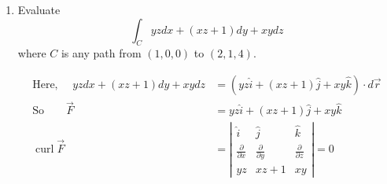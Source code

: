 \begin{enumerate}
\begin{answer}
\begin{align*}
		 &=\left(2 x^{2} z+\cos y z-y z \sin y z-2 x^{2} z-\right.\cos y z+y z \sin y z) \hat{i} \\ \qquad&+(4 x y z-4 x y z) \hat{j}+\left(2 x z^{2}-2 x z^{2}\right) \hat{k}=0 
		\end{align*}
		Since, curl $\vec{F}=0$. So, $\vec{F}$ is conservative vector field.\\ So, the given line integral is independent of path.\\ Let us find the potential $\phi$ corresponding to $\vec{F}$.
		\begin{align}
		\vec{F}&=\nabla \phi\notag\\
		\frac{\partial \phi}{\partial x} \hat{i}+\frac{\partial \phi}{\partial y} \hat{j}+\frac{\partial \phi}{\partial z} \hat{k}&=2 x y z^{2} \hat{i}+\left(x^{2} z^{2}+z \cos y z\right) \hat{j}+\left(2 x^{2} y z+y \cos y z\right) \hat{k}\notag\\
		\text{So}\qquad\frac{\partial \phi}{\partial x}&=2 x y z^{2}  \Rightarrow  \phi=x^{2} y z^{2}+\text { constant }\label{VI-03} \\ \frac{\partial \phi}{\partial y}&=x^{2} z^{2}+z \cos y z  \Rightarrow  \phi=x^{2} y z^{2}+\sin y z+\text { constant } \ldots . \label{VI-04}\\ \frac{\partial \phi}{\partial z}&=2 x^{2} y z+y \cos y z  \Rightarrow  \phi=x^{2} y z^{2}+\sin y z+\text { constant } \ldots .\label{VI-05}
		\intertext{Adding $(\ref{VI-03}),(\ref{VI-04}),(\ref{VI-05})$ and adding the common terms once}
		\phi&=x^{2} y z^{2}+\sin y z+\text{ constant}\notag
		\intertext{So, the given line integral}
		 \int 2 x y z^{2} d x&+\left(x^{2} z^{2}+z \cos y z\right) d y+\left(2 x^{2} y z+y \cos y z\right) d z \notag\\ &=\int d\left(x^{2} y z^{2}+\sin y z\right)=\left[x^{2} y z^{2}+\sin y z\right]_{(0,0,0)}^{(1, \pi / 4,2)} \notag\\ &=\pi+1 \notag
		\end{align}
	\end{answer}
	\item Evaluate
	$$
	\int_{C} y z d x+(x z+1) d y+x y d z
	$$
	where $C$ is any path from $(1,0,0)$ to $(2,1,4)$.
	\begin{answer}
		\begin{align*}
		\text{Here, }\quad y z d x+(x z+1) d y+x y d z&=(y z \hat{i}+(x z+1) \hat{j}+x y \hat{k}) \cdot d \vec{r}\\
		\text{So}\qquad \vec{F}&=y z \hat{i}+(x z+1) \hat{j}+x y \hat{k}\\
		\operatorname{curl} \vec{F}&=\left|\begin{array}{ccc}\hat{i} & \hat{j} & \hat{k} \\ \frac{\partial}{\partial x} & \frac{\partial}{\partial y} & \frac{\partial}{\partial z} \\ y z & x z+1 & x y\end{array}\right|=0

\end{align*}
\end{answer}
\end{enumerate}
